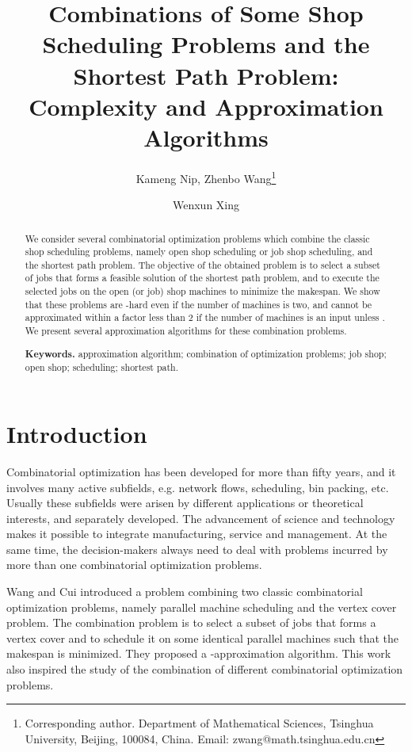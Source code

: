 \documentclass{llncs}
\numberwithin{subcase}{case}
\begin{document}
\title{Combinations of Some Shop Scheduling Problems and the Shortest Path Problem: Complexity and Approximation Algorithms}

\author{Kameng Nip, Zhenbo Wang\thanks{Corresponding author. Department of Mathematical Sciences, Tsinghua University, Beijing, 100084, China. Email: zwang@math.tsinghua.edu.cn} \and Wenxun Xing}

\maketitle
\begin{abstract}
We consider several combinatorial optimization problems which combine the classic shop scheduling problems, namely open shop scheduling or job shop scheduling, and the shortest path problem. The objective of the obtained problem is to select a subset of jobs that forms a feasible solution of the shortest path problem, and to execute the selected jobs on the open (or job) shop machines to minimize the makespan. We show that these problems are -hard even if the number of machines is two, and cannot be approximated within a factor less than 2 if the number of machines is an input unless . We present several approximation algorithms for these combination problems.

\noindent \textbf{Keywords.} approximation algorithm; combination of optimization problems; job shop; open shop; scheduling; shortest path.
\end{abstract}

\section{Introduction}
Combinatorial optimization has been developed for more than fifty years, and it involves many active subfields, e.g. network flows, scheduling, bin packing, etc. Usually these subfields were arisen by different applications or theoretical interests, and separately developed. The advancement of science and technology makes it possible to integrate manufacturing, service and management. At the same time, the decision-makers always need to deal with problems incurred by more than one combinatorial optimization problems.

Wang and Cui \cite{WC12} introduced a problem combining two classic combinatorial optimization problems, namely parallel machine scheduling and the vertex cover problem. The combination problem is to select a subset of jobs that forms a vertex cover and to schedule it on some identical parallel machines such that the makespan is minimized. They proposed a -approximation algorithm. This work also inspired the study of the combination of different combinatorial optimization problems.
\end{document}
